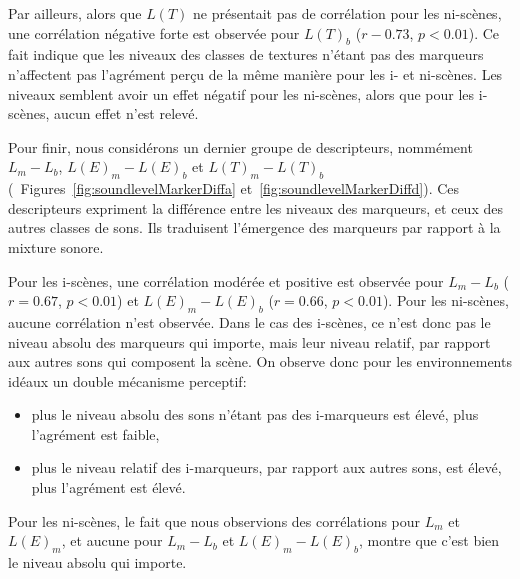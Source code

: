 \documentclass[twoside,twocolumn]{article}
\begin{document}
Par ailleurs, alors que $L(T)$ ne présentait pas de corrélation pour les ni-scènes, une corrélation négative forte est observée pour $L(T)_b$ ($r-0.73$, $p<0.01$). Ce fait indique que les niveaux des classes de textures n'étant pas des marqueurs n'affectent pas l'agrément perçu de la même manière pour les i- et ni-scènes. Les niveaux semblent avoir un effet négatif pour les ni-scènes, alors que pour les i-scènes, aucun effet n'est relevé.

Pour finir, nous considérons un dernier groupe de descripteurs, nommément $L_m-L_b$, $L(E)_m-L(E)_b$ et $L(T)_m-L(T)_b$ (\cf~Figures~\ref{fig:soundlevelMarkerDiffa} et~\ref{fig:soundlevelMarkerDiffd}). Ces descripteurs expriment la différence entre les niveaux des marqueurs, et ceux des autres classes de sons. Ils traduisent l'émergence des marqueurs par rapport à la mixture sonore.

Pour les i-scènes, une corrélation modérée et positive est observée pour $L_m-L_b$ ($r=0.67$, $p<0.01$) et $L(E)_m-L(E)_b$ ($r=0.66$, $p<0.01$). Pour les ni-scènes, aucune corrélation n'est observée. Dans le cas des i-scènes, ce n'est donc pas le niveau absolu des marqueurs qui importe, mais leur niveau relatif, par rapport aux autres sons qui composent la scène. On observe donc pour les environnements idéaux un double mécanisme perceptif:

\begin{itemize}
\item plus le niveau absolu des sons n'étant pas des i-marqueurs est élevé, plus l'agrément est faible,
\item plus le niveau relatif des i-marqueurs, par rapport aux autres sons, est élevé, plus l'agrément est élevé.
\end{itemize}

Pour les ni-scènes, le fait que nous observions des corrélations pour $L_m$ et $L(E)_m$, et aucune pour $L_m-L_b$ et $L(E)_m-L(E)_b$, montre que c'est bien le niveau absolu qui importe.
\end{document}
